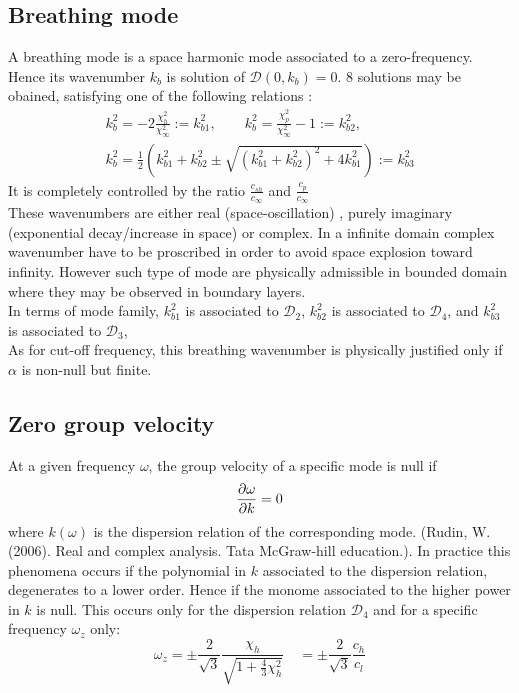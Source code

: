 \documentclass[
10pt, %
a4paper, %
oneside, %
headinclude,footinclude, %
table
]{scrartcl}
\begin{document}
\subsection{Breathing mode}
A breathing mode is a space harmonic mode associated to a zero-frequency. Hence its wavenumber $k_{b}$ is solution of $\mathcal{D}(0,k_{b})=0$. 8 solutions may be obained, satisfying one of the following relations :
$$
\begin{array}{c}
k^2_{b}=-2\frac{\chi_{h}^2}{\chi_{\infty}^2}:=k^2_{b1}, \quad\quad
k^2_{b}=\frac{\chi_{p}^2}{\chi_{\infty}^2}-1:=k^2_{b2}, \\[8pt]
k^2_{b}=\frac{1}{2}\left(k^2_{b1}+k^2_{b2}\pm \sqrt{(k^2_{b1}+k^2_{b2})^2+4k^2_{b1}}\right):=k^2_{b3}
\end{array}
$$
It is completely controlled by the ratio $\frac{c_{sh}}{c_{\infty}}$ and 
$\frac{c_{p}}{c_{\infty}}$\\
These wavenumbers are either real (space-oscillation) , purely imaginary (exponential 
decay/increase in space) or complex. In a infinite domain complex wavenumber have to be proscribed 
in order to avoid space explosion toward infinity. However such type of mode are physically 
admissible in bounded domain where they may be observed in boundary layers.  \\
In terms of mode family, $k^2_{b1}$ is associated to $\mathcal{D}_{2}$, $k^2_{b2}$ is associated to $\mathcal{D}_{4}$, and $k^2_{b3}$ is associated to $\mathcal{D}_{3}$, \\
As for cut-off frequency, this breathing wavenumber is physically justified only if $\alpha$ is non-null but finite. 

\subsection{Zero group velocity}
At a given frequency $\omega$, the group velocity of a specific mode is null if 
$$
\frac{\partial \omega}{\partial k}=0
$$
where $k(\omega)$ is the dispersion relation of the corresponding mode. (Rudin, W. (2006). Real and complex analysis. Tata McGraw-hill education.). In practice this phenomena occurs if the polynomial in $k$ associated to the dispersion relation, degenerates to a lower order. Hence if the monome associated to the higher power in $k$ is null. This occurs only for the dispersion relation $\mathcal{D}_{4}$ and for a specific frequency $\omega_{z}$ only: 
$$
\boxed{\omega_{z}=\pm\frac{2}{\sqrt{3}}\frac{\chi_{h}}{\sqrt {1+\frac{4}{3}\chi_{h}^2}}\quad =\pm\frac{2}{\sqrt{3}}\frac{c_{h}}{c_{l}}}
$$
\end{document}
